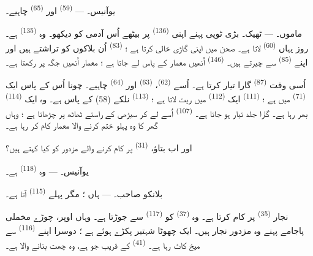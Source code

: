 \textsc{یوآنیس}۔ ---  \textsuperscript{(59)}
اور  \textsuperscript{(65)} چاہیے۔

\textsc{ماموں}۔ --- ٹھیک۔ بڑی ٹوپی پہنے اپنی 
\textsuperscript{(136)} پر بیٹھے اُس آدمی کو دیکھو۔ وہ
 \textsuperscript{(135)} ہے۔ روز یہاں  \textsuperscript{(60)} لاتا ہے۔ صحن میں اپنی گاڑی خالی کرتا
ہے ؛  \textsuperscript{(83)} اُن بلاکوں کو
تراشتے ہیں اور اپنے  \textsuperscript{(85)} سے
چیرتے ہیں۔  \textsuperscript{(146)} اُنھیں معمار کے
پاس لے جاتا ہے ؛ معمار اُنھیں جگہ پر رکھتا ہے۔

اُسی وقت  \textsuperscript{(87)} گارا تیار
کرتا ہے۔ اُسے  \textsuperscript{(62)}، 
\textsuperscript{(63)} اور  \textsuperscript{(64)} چاہیے۔
چونا اُس کے پاس ایک  \textsuperscript{(71)} میں ہے ؛
 \textsuperscript{(111)} ایک 
\textsuperscript{(112)} میں ریت لاتا ہے ؛ 
\textsuperscript{(113)} نلکے (58) کے پاس ہے۔ وہ ایک 
\textsuperscript{(114)} بھر رہا ہے۔ گارا جلد تیار ہو جاتا ہے۔
 \textsuperscript{(107)} اُسے لے کر سیڑھی کے
راستے ٹھاٹھ پر چڑھاتا ہے ؛ وہاں گھر کا وہ پہلو ختم کرنے والا معمار
کام کر رہا ہے۔

اور اب بتاؤ،  \textsuperscript{(31)} پر کام کرنے والے
مزدور کو کیا کہتے ہیں؟

\textsc{یوآنیس}۔ --- وہ  \textsuperscript{(118)}
ہے۔

\VUsaut{3.0mm}
\VUsaut{3.0mm}

\textsc{بلانکو صاحب}۔ --- ہاں ؛ مگر پہلے 
\textsuperscript{(115)} آتا ہے۔

نجار  \textsuperscript{(35)} پر کام کرتا ہے۔ وہ
 \textsuperscript{(37)} کو 
\textsuperscript{(117)} سے جوڑتا ہے۔ وہاں اوپر، چوڑے مخملی پاجامے
پہنے وہ مزدور نجار ہیں۔ ایک چھوٹا شہتیر پکڑے ہوئے ہے ؛ دوسرا اپنے
 \textsuperscript{(116)} سے میخ کاٹ رہا ہے۔
 \textsuperscript{(41)} کے قریب جو ہے، وہ چھت
بنانے والا ہے۔


